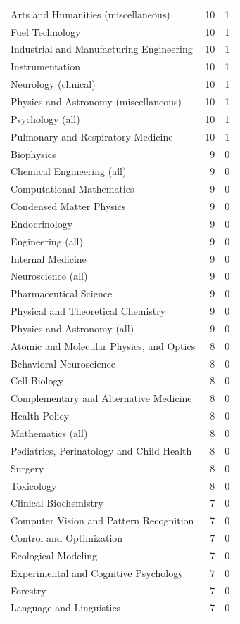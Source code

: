 \documentclass[12pt,brazil]{article}\usepackage[]{graphicx}\usepackage[]{xcolor}
\begin{document}
\begin{longtable}{lrr}
Arts and Humanities (miscellaneous) & 10 & 1 \\
Fuel Technology & 10 & 1 \\
Industrial and Manufacturing Engineering & 10 & 1 \\
Instrumentation & 10 & 1 \\
Neurology (clinical) & 10 & 1 \\
Physics and Astronomy (miscellaneous) & 10 & 1 \\
Psychology (all) & 10 & 1 \\
Pulmonary and Respiratory Medicine & 10 & 1 \\
Biophysics & 9 & 0 \\
Chemical Engineering (all) & 9 & 0 \\
Computational Mathematics & 9 & 0 \\
Condensed Matter Physics & 9 & 0 \\
Endocrinology & 9 & 0 \\
Engineering (all) & 9 & 0 \\
Internal Medicine & 9 & 0 \\
Neuroscience (all) & 9 & 0 \\
Pharmaceutical Science & 9 & 0 \\
Physical and Theoretical Chemistry & 9 & 0 \\
Physics and Astronomy (all) & 9 & 0 \\
Atomic and Molecular Physics, and Optics & 8 & 0 \\
Behavioral Neuroscience & 8 & 0 \\
Cell Biology & 8 & 0 \\
Complementary and Alternative Medicine & 8 & 0 \\
Health Policy & 8 & 0 \\
Mathematics (all) & 8 & 0 \\
Pediatrics, Perinatology and Child Health & 8 & 0 \\
Surgery & 8 & 0 \\
Toxicology & 8 & 0 \\
Clinical Biochemistry & 7 & 0 \\
Computer Vision and Pattern Recognition & 7 & 0 \\
Control and Optimization & 7 & 0 \\
Ecological Modeling & 7 & 0 \\
Experimental and Cognitive Psychology & 7 & 0 \\
Forestry & 7 & 0 \\
Language and Linguistics & 7 & 0 \\

\end{longtable}
\end{document}
